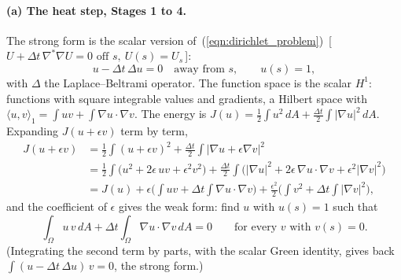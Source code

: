 \paragraph{(a) The heat step, Stages 1 to 4.} The strong form is the scalar version of~(\ref{eqn:dirichlet_problem})~[\,$U + \Delta t\,\nabla^*\nabla U = 0 \text{ off } s,\ U(s) = U_s$\,]:
\begin{equation*}
u - \Delta t\, \Delta u = 0 \quad \text{away from } s, \qquad u(s) = 1 ,
\end{equation*}
with $\Delta$ the Laplace--Beltrami operator. The function space is the scalar $H^1$: functions with square integrable values and gradients, a Hilbert space with $\langle u, v\rangle_1 = \int uv + \int\nabla u\cdot\nabla v$. The energy is $J(u) = \frac12\int u^2\, dA + \frac{\Delta t}{2}\int|\nabla u|^2\, dA$. Expanding $J(u + \epsilon v)$ term by term,
\begin{align*}
J(u + \epsilon v) &= \frac12\int (u + \epsilon v)^2 + \frac{\Delta t}{2}\int |\nabla u + \epsilon\nabla v|^2 \\
&= \frac12\int \big(u^2 + 2\epsilon\, uv + \epsilon^2 v^2\big) + \frac{\Delta t}{2}\int\big(|\nabla u|^2 + 2\epsilon\,\nabla u\cdot\nabla v + \epsilon^2|\nabla v|^2\big) \\
&= J(u) + \epsilon\Big(\int uv + \Delta t\int\nabla u\cdot\nabla v\Big) + \frac{\epsilon^2}{2}\Big(\int v^2 + \Delta t\int|\nabla v|^2\Big),
\end{align*}
and the coefficient of $\epsilon$ gives the weak form: find $u$ with $u(s) = 1$ such that
\begin{equation}
\label{eqn:app_heat_weak}
\int_\Omega u\, v\, dA + \Delta t\int_\Omega \nabla u\cdot\nabla v\, dA = 0 \qquad \text{for every } v \text{ with } v(s) = 0 .
\end{equation}
(Integrating the second term by parts, with the scalar Green identity, gives back $\int(u - \Delta t\,\Delta u)\,v = 0$, the strong form.)

